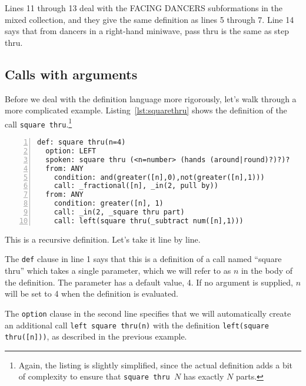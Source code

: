 \documentclass[12pt]{article}
\newcommand{\clause}[1]{\texttt{#1}}
\renewcommand{\call}[1]{\texttt{#1}} %
\begin{document}
Lines 11 through 13 deal with the \textsf{FACING DANCERS}
subformations in the mixed collection, and they give the same
definition as lines 5 through 7.   Line 14 says that from dancers in a
right-hand miniwave, pass thru is the same as step thru.

\subsection{Calls with arguments}

Before we deal with the definition language more rigorously, let's walk through
a more complicated example.  Listing~\ref{lst:squarethru} shows
the definition of the call \call{square thru}.\footnote{Again, the listing is
  slightly simplified, since the actual definition adds a bit of
  complexity to ensure that \call{square thru $N$} has exactly
  $N$ parts.}

\begin{lstlisting}[numbers=left,float,caption=A definition with arguments.,label=lst:squarethru]
def: square thru(n=4)
  option: LEFT
  spoken: square thru (<n=number> (hands (around|round)?)?)?
  from: ANY
    condition: and(greater([n],0),not(greater([n],1)))
    call: _fractional([n], _in(2, pull by))
  from: ANY
    condition: greater([n], 1)
    call: _in(2, _square thru part)
    call: left(square thru(_subtract num([n],1)))
\end{lstlisting}

This is a recursive definition.  Let's take it line by line.

The \clause{def} clause in line 1 says that this is a definition of a call named
``square thru'' which takes a single parameter, which we will refer to
as $n$ in the body of the definition.  The parameter has a
default value, 4.  If no argument is supplied, $n$ will be set
to 4 when the definition is evaluated.

The \clause{option} clause in the second line specifies that we will
automatically create an
additional call \call{left square thru(n)} with the definition
\call{left(square thru([n]))}, as described in the previous example.
\end{document}
